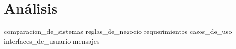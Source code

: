 %
%

\section{Análisis}

{comparacion_de_sistemas}
{reglas_de_negocio}
{requerimientos}
{casos_de_uso}
{interfaces_de_usuario}
{mensajes}

